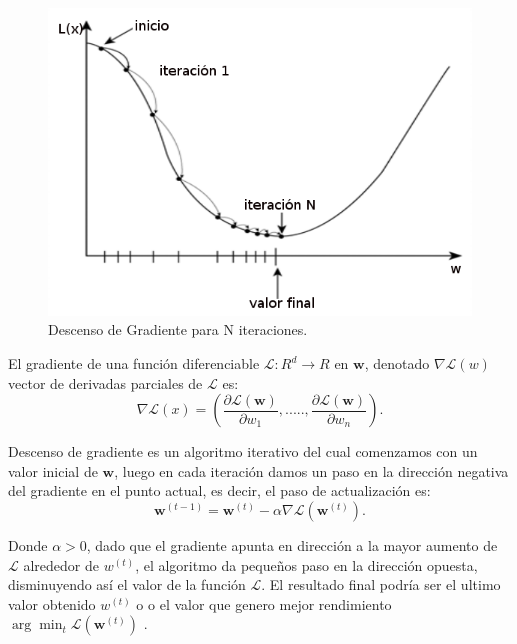 \begin{figure}[H] \centering
  \includegraphics[scale=0.4,keepaspectratio=true,clip=true]{imagenes/MarcoTeorico/gradient-descent.png}
  \caption{Descenso de Gradiente para N iteraciones.}\label{Fig:gradient-descent}
\end{figure}


El gradiente de una función diferenciable $ \mathcal{L}: R^d \longrightarrow R $ en $\textbf{w}$, denotado $ \nabla \mathcal{L}(w) $ vector de derivadas parciales de $\mathcal{L}$ es:
\begin{equation}
\nabla \mathcal{L}(x) = (\frac{\partial \mathcal{L}(\textbf{w})}{\partial w_1},....., \frac{\partial \mathcal{L}(\textbf{w})}{\partial w_n}).
\end{equation}

Descenso de gradiente es un algoritmo iterativo del cual comenzamos con un valor inicial de $\textbf{w}$, luego en cada iteración damos un paso en la dirección negativa del gradiente en el punto actual, es decir, el paso de actualización es:
\begin{equation}
\textbf{w}^{(t-1)} = \textbf{w}^{(t)} - \alpha \nabla \mathcal{L}(\textbf{w}^{(t)}).
\end{equation}

Donde $ \alpha > 0$, dado que el gradiente apunta en  dirección a la mayor aumento de $\mathcal{L}$ alrededor de $w^{(t)}$, el algoritmo da pequeños paso en la dirección opuesta, disminuyendo así el valor de la función $\mathcal{L}$. El resultado final podría ser el ultimo valor obtenido $w^{(t)}$ o o el valor que genero mejor rendimiento $\arg\min_{t}\mathcal{L}(\textbf{w}^{(t)})$ \citep{gradient_des}.

